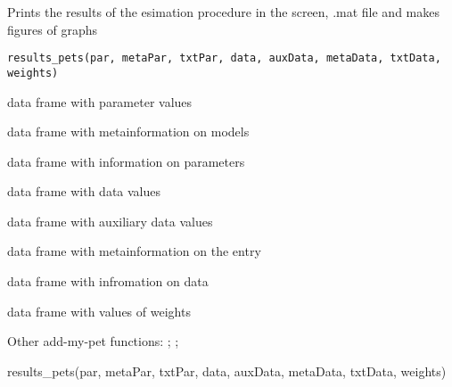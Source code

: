 \documentclass[a4paper]{book}
\begin{document}
%
\begin{Description}\relax
Prints the results of the esimation procedure in the screen, .mat file and makes figures of graphs
\end{Description}
%
\begin{Usage}
\begin{verbatim}
results_pets(par, metaPar, txtPar, data, auxData, metaData, txtData, weights)
\end{verbatim}
\end{Usage}
%
\begin{Arguments}
\begin{ldescription}
\item[\code{par}] data frame with parameter values

\item[\code{metaPar}] data frame with metainformation on models

\item[\code{txtPar}] data frame with information on parameters

\item[\code{data}] data frame with data values

\item[\code{auxData}] data frame with auxiliary data values

\item[\code{metaData}] data frame with metainformation on the entry

\item[\code{txtData}] data frame with infromation on data

\item[\code{weights}] data frame with values of weights
\end{ldescription}
\end{Arguments}
%
\begin{SeeAlso}\relax
Other add-my-pet functions: ;
; 
\end{SeeAlso}
%
\begin{Examples}
\begin{ExampleCode}
results_pets(par, metaPar, txtPar, data, auxData, metaData, txtData, weights)
\end{ExampleCode}
\end{Examples}
\end{document}
